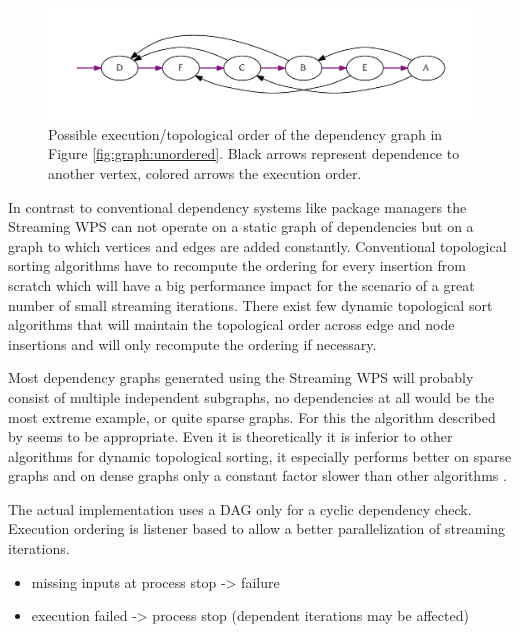		\begin{figure}[!htb]
			\centering
			\includegraphics[width=1\textwidth]{figures/ordered-graph.pdf} %
			\caption{\label{fig:graph:ordered} Possible execution/topological order of the dependency graph in Figure \ref{fig:graph:unordered}. Black arrows represent dependence to another vertex, colored arrows the execution order.}
		\end{figure}

		In contrast to conventional dependency systems like package managers the Streaming \ac{WPS} can not operate on a static graph of dependencies but on a graph to which vertices and edges are added constantly. Conventional topological sorting algorithms have to recompute the ordering for every insertion from scratch which will have a big performance impact for the scenario of a great number of small streaming iterations. There exist few dynamic topological sort algorithms that will maintain the topological order across edge and node insertions and will only recompute the ordering if necessary.

		Most dependency graphs generated using the Streaming \ac{WPS} will probably consist of multiple independent subgraphs, no dependencies at all would be the most extreme example, or quite sparse graphs. For this the algorithm described by \citet{pearce2007dynamic} seems to be appropriate. Even it is theoretically it is inferior to other algorithms for dynamic topological sorting, it especially performs better on sparse graphs and on dense graphs only a constant factor slower than other algorithms \citep{pearce2007dynamic}. %

		The actual implementation uses a \ac{DAG} only for a cyclic dependency check. Execution ordering is listener based to allow a better parallelization of streaming iterations.

		\begin{itemize}
			\item missing inputs at process stop -> failure
			\item execution failed -> process stop (dependent iterations may be affected)
		\end{itemize}

